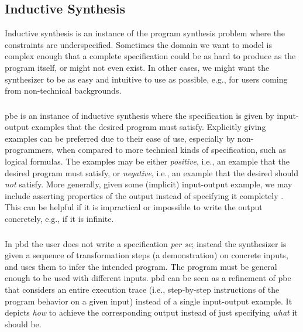 \subsection{Inductive Synthesis}
\label{sec:inductive}

Inductive synthesis is an instance of the program synthesis problem where the
constraints are underspecified.
Sometimes the domain we want to model is complex enough that a complete
specification could be as hard to produce as the program itself, or might not
even exist.
In other cases, we might want the synthesizer to be as easy and intuitive to use
as possible, e.g., for users coming from non-technical backgrounds.

\subsubsection{}

\gls{pbe} is an instance of inductive synthesis where the specification is given
by input-output examples that the desired program must satisfy.
Explicitly giving examples can be preferred due to their ease of use, especially
by non-programmers, when compared to more technical kinds of specification, such
as logical formulas.
The examples may be either \textit{positive}, i.e., an example that the desired
program must satisfy, or \textit{negative}, i.e., an example that the desired
should \textit{not} satisfy.
More generally, given some (implicit) input-output example, we may include asserting
properties of the output instead of specifying it completely
\cite{Polozov:2015:FFI}.
This can be helpful if it is impractical or impossible
to write the output concretely, e.g., if it is infinite.

\subsubsection{}

In \gls{pbd} the user does not write a specification \textit{per se};
instead the synthesizer is given a sequence of transformation steps (a
demonstration) on concrete inputs, and uses them to infer the intended program.
The program must be general enough to be used with different inputs.
\gls{pbd} can be seen as a refinement of \gls{pbe} that
considers an entire execution trace (i.e., step-by-step instructions of the
program behavior on a given input) instead of a single input-output example.
It depicts \textit{how} to achieve the corresponding output instead of just
specifying \textit{what} it should be.


